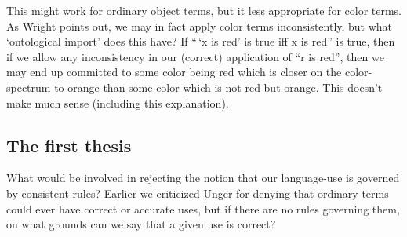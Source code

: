 \documentclass[11pt]{standalone}
\begin{document}
\begin{spacing}{1.5}
\begin{enumerate}
    This might work for ordinary object terms, but it less appropriate
    for color terms.  As Wright points out, we may in fact apply color
    terms inconsistently, but what `ontological import' does this
    have?  If ``\,`x is red' is true iff x is red'' is true, then if
    we allow any inconsistency in our (correct) application of ``r is
    red'', then we may end up committed to some color being red which
    is closer on the color-spectrum to orange than some color which is
    not red but orange.  This doesn't make much sense (including this
    explanation).
\end{enumerate}

\subsection{The first thesis}
What would be involved in rejecting the notion that our language-use
is governed by consistent rules?  Earlier we criticized Unger for
denying that ordinary terms could ever have correct or accurate uses,
but if there are no rules governing them, on what grounds can we say
that a given use is correct?
\ifstandalone
\end{spacing}


\fi
\end{document}
